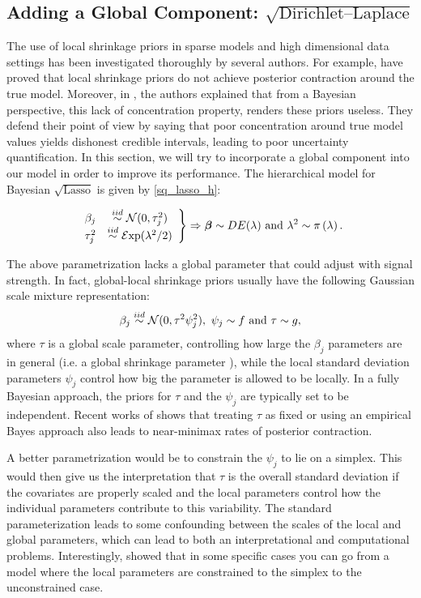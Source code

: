\documentclass[10pt]{article}
\def\sql{$\sqrt{\text{Lasso}}$}
\begin{document}
\subsection{Adding a Global Component: $ \sqrt{\text{Dirichlet--Laplace}}$}

The use of local shrinkage priors in sparse models and high dimensional data settings has been investigated thoroughly by several authors. For example, \citep{castillo2015bayesian} have proved that local shrinkage priors do not achieve posterior contraction around the true model. Moreover, in \cite{castillo2015bayesian}, the authors explained that from a Bayesian perspective, this lack of concentration property, renders these priors useless. They defend their point of view by saying that poor concentration around true model values yields dishonest credible intervals, leading to poor uncertainty quantification. In this section, we will try to incorporate a global component into our model in order to improve its performance. The hierarchical model for Bayesian \sql{} is given by \eqref{sq_lasso_h}:

\begin{equation} \label{Lasso_prior}
\left.
\begin{array}{cc}
\beta_j & \stackrel{iid}{\sim} \mathcal{N}(0 , \tau_j^2) \\
\tau_j^2 & \stackrel{iid}{\sim} \mathcal{E}\mathrm{xp}(\lambda^2/2) 
\end{array} \right \} \Rightarrow
\boldsymbol{\beta} \sim DE(\lambda) \text{ and } \lambda^2 \sim \pi \left(\lambda \right). 
\end{equation}

The above parametrization lacks a global parameter that could adjust with signal strength. In fact, global-local shrinkage priors usually have the following Gaussian scale mixture representation: \[ \beta_j \stackrel{iid}{\sim} \mathcal{N}(0 , \tau^2 \psi_j^2), \ \psi_j \sim f \mbox{ and} \ \tau \sim g, \] where $\tau$ is a global scale parameter, controlling how large the $\beta_j$ parameters are in general (\rm{i.e.} a global shrinkage parameter ), while the local standard deviation parameters $\psi_j$ control how big the parameter is allowed to be locally.  In a fully Bayesian approach, the priors for $\tau$ and the $\psi_j$ are typically set to be independent.  Recent works of \citet{van2017adaptive} shows that treating $\tau$ as fixed or using an empirical Bayes approach also leads to near-minimax rates of posterior contraction. 

A better parametrization would be to constrain the $\psi_j$ to lie on a simplex.  This would then give us the interpretation that $\tau$ is the overall standard deviation if the covariates are properly scaled  and the local parameters control how the individual parameters contribute to this variability. The standard parameterization leads to some confounding between the scales of the local and global parameters, which can lead to both an interpretational and computational problems.  Interestingly, \citet{bhattacharya2014dirichlet} showed that in some specific cases you can go from a model where the local parameters are constrained to the simplex to the unconstrained case.
\end{document}
